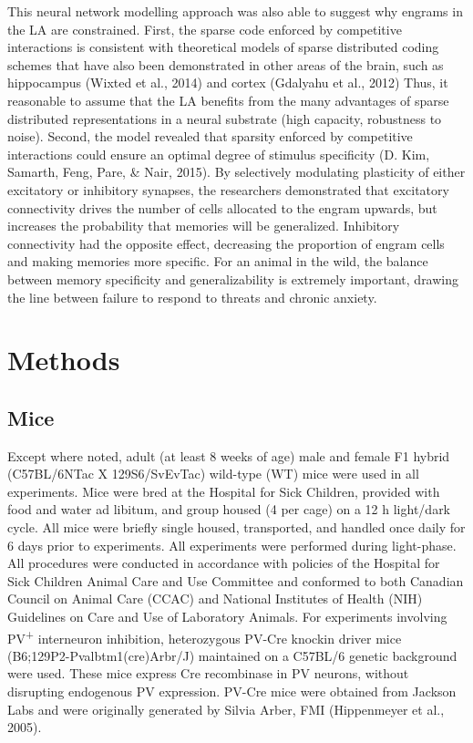 \documentclass[12pt,a4paperpaper,]{report}
\begin{document}
This neural network modelling approach was also able to suggest why
engrams in the LA are constrained. First, the sparse code enforced by
competitive interactions is consistent with theoretical models of sparse
distributed coding schemes that have also been demonstrated in other
areas of the brain, such as hippocampus (Wixted et al., 2014) and cortex
(Gdalyahu et al., 2012) Thus, it reasonable to assume that the LA
benefits from the many advantages of sparse distributed representations
in a neural substrate (high capacity, robustness to noise). Second, the
model revealed that sparsity enforced by competitive interactions could
ensure an optimal degree of stimulus specificity (D. Kim, Samarth, Feng,
Pare, \& Nair, 2015). By selectively modulating plasticity of either
excitatory or inhibitory synapses, the researchers demonstrated that
excitatory connectivity drives the number of cells allocated to the
engram upwards, but increases the probability that memories will be
generalized. Inhibitory connectivity had the opposite effect, decreasing
the proportion of engram cells and making memories more specific. For an
animal in the wild, the balance between memory specificity and
generalizability is extremely important, drawing the line between
failure to respond to threats and chronic anxiety.

\chapter{Methods}\label{methods}

\section{Mice}\label{mice}

Except where noted, adult (at least 8 weeks of age) male and female F1
hybrid (C57BL/6NTac X 129S6/SvEvTac) wild-type (WT) mice were used in
all experiments. Mice were bred at the Hospital for Sick Children,
provided with food and water ad libitum, and group housed (4 per cage)
on a 12 h light/dark cycle. All mice were briefly single housed,
transported, and handled once daily for 6 days prior to experiments. All
experiments were performed during light-phase. All procedures were
conducted in accordance with policies of the Hospital for Sick Children
Animal Care and Use Committee and conformed to both Canadian Council on
Animal Care (CCAC) and National Institutes of Health (NIH) Guidelines on
Care and Use of Laboratory Animals. For experiments involving
PV\textsuperscript{+} interneuron inhibition, heterozygous PV-Cre
knockin driver mice (B6;129P2-Pvalbtm1(cre)Arbr/J) maintained on a
C57BL/6 genetic background were used. These mice express Cre recombinase
in PV neurons, without disrupting endogenous PV expression. PV-Cre mice
were obtained from Jackson Labs and were originally generated by Silvia
Arber, FMI (Hippenmeyer et al., 2005).
\end{document}
